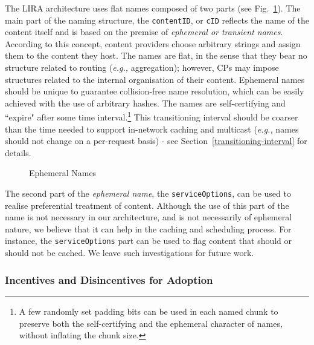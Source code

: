 \documentclass{sig-alternate}
\newcommand{\eg}{{\em e.g.,\/ }}
\begin{document}
The LIRA architecture uses flat names composed of two parts (see Fig.~\ref{ephemeral-names}). The main part of the naming structure, the \texttt{contentID}, or \texttt{cID} reflects the name of the content itself and is based on the premise of \textit{ephemeral or transient names}. According to this concept, content providers choose arbitrary strings and assign them to the content they host. The names are flat, in the sense that they bear no structure related to routing (\eg aggregation); however, CPs may impose structures related to the internal organisation of their content. Ephemeral names should be unique to guarantee collision-free name resolution, which can be easily achieved with the use of arbitrary hashes. The names are self-certifying and ``expire" after some time interval.\footnote{A few randomly set padding bits can be used in each named chunk to preserve both the self-certifying and the ephemeral character of names, without inflating the chunk size.}
This transitioning interval should be coarser than the time needed to support in-network caching and multicast (\eg names should not change on a per-request basis) - see Section~\ref{transitioning-interval} for details.



\begin{figure}[h!]
\begin{centering}
\small

\caption{Ephemeral Names}
\label{ephemeral-names}
\end{centering}
\end{figure}


\normalsize




The second part of the \textit{ephemeral name}, the \texttt{serviceOptions}, can be used to realise preferential treatment of content. Although the use of this part of the name is not necessary in our architecture, and is not necessarily of ephemeral nature, we believe that it can help in the caching and scheduling process. For instance, the \texttt{serviceOptions} part can be used to flag content that should or should not be cached. We leave such investigations for future work.







\subsubsection{Incentives and Disincentives for Adoption}
\end{document}
